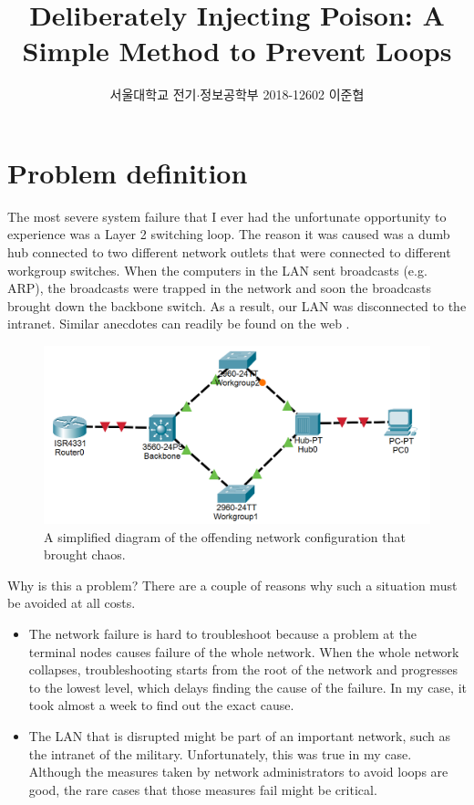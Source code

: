 \documentclass{article}
\title{Deliberately Injecting Poison: A Simple Method to Prevent Loops}
\author{서울대학교 전기$\cdot$정보공학부 2018-12602 이준협}
\date{}
\begin{document}
\maketitle
\section{Problem definition}

The most severe system failure that I ever had the unfortunate opportunity to experience was a Layer 2 switching loop. The reason it was caused was a dumb hub connected to two different network outlets that were connected to different workgroup switches. When the computers in the LAN sent broadcasts (e.g. ARP), the broadcasts were trapped in the network and soon the broadcasts brought down the backbone switch. As a result, our LAN was disconnected to the intranet. Similar anecdotes can readily be found on the web \cite{Anecdote2} \cite{Anecdote1}.
\begin{figure}[htb]
    \centering
    \includegraphics[scale=0.8]{storm.png}
    \caption{A simplified diagram of the offending network configuration that brought chaos.}
    \label{fig:storm}
\end{figure}

Why is this a problem? There are a couple of reasons why such a situation must be avoided at all costs.
\begin{itemize}
    \item The network failure is hard to troubleshoot because a problem at the terminal nodes causes failure of the whole network. When the whole network collapses, troubleshooting starts from the root of the network and progresses to the lowest level, which delays finding the cause of the failure. In my case, it took almost a week to find out the exact cause.
    \item The LAN that is disrupted might be part of an important network, such as the intranet of the military. Unfortunately, this was true in my case. Although the measures taken by network administrators to avoid loops are good, the rare cases that those measures fail might be critical.
\end{itemize}
\end{document}
